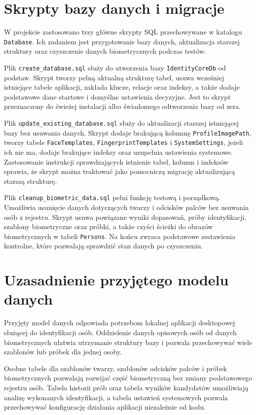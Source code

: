 \section{Skrypty bazy danych i migracje}

W projekcie zastosowano trzy główne skrypty SQL przechowywane w katalogu \texttt{Database}. Ich zadaniem jest przygotowanie bazy danych, aktualizacja starszej struktury oraz czyszczenie danych biometrycznych podczas testów.

Plik \texttt{create\_database.sql} służy do utworzenia bazy \texttt{IdentityCoreDb} od podstaw. Skrypt tworzy pełną aktualną strukturę tabel, usuwa wcześniej istniejące tabele aplikacji, zakłada klucze, relacje oraz indeksy, a także dodaje podstawowe dane startowe i domyślne ustawienia decyzyjne. Jest to skrypt przeznaczony do świeżej instalacji albo świadomego odtworzenia bazy od zera.

Plik \texttt{update\_existing\_database.sql} służy do aktualizacji starszej istniejącej bazy bez usuwania danych. Skrypt dodaje brakującą kolumnę \texttt{ProfileImagePath}, tworzy tabele \texttt{FaceTemplates}, \texttt{FingerprintTemplates} i \texttt{SystemSettings}, jeżeli ich nie ma, dodaje brakujące indeksy oraz uzupełnia ustawienia systemowe. Zastosowanie instrukcji sprawdzających istnienie tabel, kolumn i indeksów sprawia, że skrypt można traktować jako pomocniczą migrację aktualizującą starszą strukturę.

Plik \texttt{cleanup\_biometric\_data.sql} pełni funkcję testową i porządkową. Umożliwia usunięcie danych dotyczących twarzy i odcisków palców bez usuwania osób z rejestru. Skrypt usuwa powiązane wyniki dopasowań, próby identyfikacji, szablony biometryczne oraz próbki, a także czyści ścieżki do obrazów biometrycznych w tabeli \texttt{Persons}. Na końcu zwraca podstawowe zestawienia kontrolne, które pozwalają sprawdzić stan danych po czyszczeniu.

\section{Uzasadnienie przyjętego modelu danych}

Przyjęty model danych odpowiada potrzebom lokalnej aplikacji desktopowej służącej do identyfikacji osób. Oddzielenie danych opisowych osób od danych biometrycznych ułatwia utrzymanie struktury bazy i pozwala przechowywać wiele szablonów lub próbek dla jednej osoby.

Osobne tabele dla szablonów twarzy, szablonów odcisków palców i próbek biometrycznych pozwalają rozwijać część biometryczną bez zmiany podstawowego rejestru osób. Tabela historii prób oraz tabela wyników kandydatów umożliwiają analizę wykonanych identyfikacji, a tabela ustawień systemowych pozwala przechowywać konfigurację działania aplikacji niezależnie od kodu.